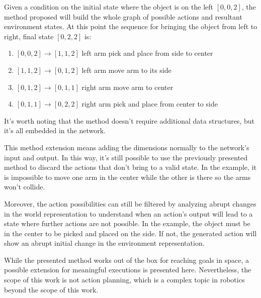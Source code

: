 Given a condition on the initial state where the object is on the left $[0,0,2]$, the method proposed will build the whole graph of possible actions and resultant environment states. At this point the sequence for bringing the object from left to right, final state $[0,2,2]$ is:
\begin{enumerate}
  \item $[0,0,2] \rightarrow [1,1,2]$ left arm pick and place from side to center
  \item $[1,1,2] \rightarrow [0,1,2]$ left arm move arm to its side
  \item $[0,1,2] \rightarrow [0,1,1]$ right arm move arm to center
  \item $[0,1,1] \rightarrow [0,2,2]$ right arm pick and place from center to side
\end{enumerate}

It's worth noting that the method doesn't require additional data structures, but it's all embedded in the network. 

This method extension means adding the dimensions normally to the network's input and output. In this way, it's still possible to use the previously presented method to discard the actions that don't bring to a valid state. In the example, it is impossible to move one arm in the center while the other is there so the arms won't collide. 

Moreover, the action possibilities can still be filtered by analyzing abrupt changes in the world representation to understand when an action's output will lead to a state where further actions are not possible. In the example, the object must be in the center to be picked and placed on the side. If not, the generated action will show an abrupt initial change in the environment representation.

While the presented method works out of the box for reaching goals in space, a possible extension for meaningful executions is presented here. Nevertheless, the scope of this work is not action planning, which is a complex topic in robotics beyond the scope of this work.

